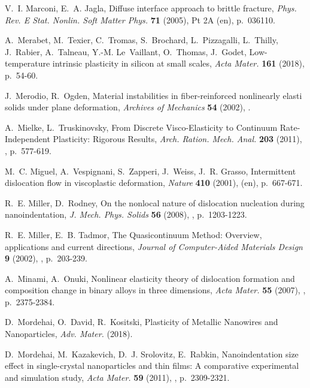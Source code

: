 \documentclass[CRPHYS,Unicode,manuscript]{cedram}
\begin{document}
\begin{thebibliography}{100}
V.~I. Marconi, E.~A. Jagla, {\og Diffuse interface approach to brittle
  fracture\fg}, \emph{Phys. Rev. E Stat. Nonlin. Soft Matter Phys.} \textbf{71}
  (2005),  Pt 2A (en), p.~036110.

A.~Merabet, M.~Texier, C.~Tromas, S.~Brochard, L.~Pizzagalli, L.~Thilly,
  J.~Rabier, A.~Talneau, Y.-M. Le~Vaillant, O.~Thomas, J.~Godet, {\og
  Low-temperature intrinsic plasticity in silicon at small scales\fg},
  \emph{Acta Mater.} \textbf{161} (2018), p.~54-60.

J.~Merodio, R.~Ogden, {\og Material instabilities in fiber-reinforced
  nonlinearly elasti solids under plane deformation\fg}, \emph{Archives of
  Mechanics} \textbf{54} (2002), .

A.~Mielke, L.~Truskinovsky, {\og From Discrete {Visco-Elasticity} to Continuum
  {Rate-Independent} Plasticity: Rigorous Results\fg}, \emph{Arch. Ration.
  Mech. Anal.} \textbf{203} (2011), , p.~577-619.

M.~C. Miguel, A.~Vespignani, S.~Zapperi, J.~Weiss, J.~R. Grasso, {\og
  Intermittent dislocation flow in viscoplastic deformation\fg}, \emph{Nature}
  \textbf{410} (2001),  (en), p.~667-671.

R.~E. Miller, D.~Rodney, {\og On the nonlocal nature of dislocation nucleation
  during nanoindentation\fg}, \emph{J. Mech. Phys. Solids} \textbf{56} (2008),
  , p.~1203-1223.

R.~E. Miller, E.~B. Tadmor, {\og The Quasicontinuum Method: Overview,
  applications and current directions\fg}, \emph{Journal of Computer-Aided
  Materials Design} \textbf{9} (2002), , p.~203-239.

A.~Minami, A.~Onuki, {\og Nonlinear elasticity theory of dislocation formation
  and composition change in binary alloys in three dimensions\fg}, \emph{Acta
  Mater.} \textbf{55} (2007), , p.~2375-2384.

D.~Mordehai, O.~David, R.~Kositski, { Plasticity
  of Metallic Nanowires and Nanoparticles\fg}, \emph{Adv. Mater.} (2018).

D.~Mordehai, M.~Kazakevich, D.~J. Srolovitz, E.~Rabkin, {\og Nanoindentation
  size effect in single-crystal nanoparticles and thin films: A comparative
  experimental and simulation study\fg}, \emph{Acta Mater.} \textbf{59} (2011),
  , p.~2309-2321.


\end{thebibliography}
\end{document}
